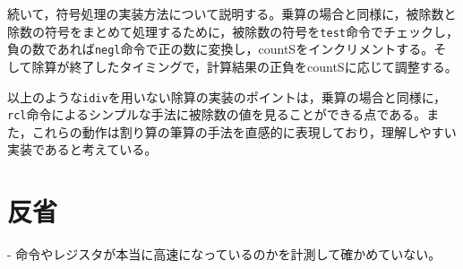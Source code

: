 \documentclass[a4paper]{jsarticle}
\newcommand{\var}[1]{\texttt{#1}}
\begin{document}
続いて，符号処理の実装方法について説明する。乗算の場合と同様に，被除数と除数の符号をまとめて処理するために，被除数の符号を\var{test}命令でチェックし，負の数であれば\var{negl}命令で正の数に変換し，countSをインクリメントする。そして除算が終了したタイミングで，計算結果の正負をcountSに応じて調整する。

以上のような\var{idiv}を用いない除算の実装のポイントは，乗算の場合と同様に，\var{rcl}命令によるシンプルな手法に被除数の値を見ることができる点である。また，これらの動作は割り算の筆算の手法を直感的に表現しており，理解しやすい実装であると考えている。


\section{反省}
- 命令やレジスタが本当に高速になっているのかを計測して確かめていない。
\end{document}
